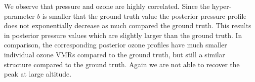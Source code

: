 We observe that pressure and ozone are highly correlated.
Since the hyper-parameter $b$ is smaller that the ground truth value the posterior pressure profile does not exponentially decrease as much compared the ground truth.
This results in posterior pressure values which are slightly larger than the ground truth.
In comparison, the corresponding posterior ozone profiles have much smaller individual ozone VMRs compared to the ground truth, but still a similar structure compared to the ground truth.
Again we are not able to recover the peak at large altitude.
\clearpage









